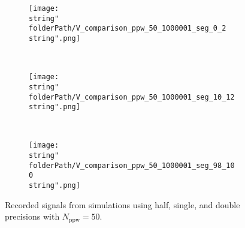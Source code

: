 

\renewcommand{\folderPath}{\string"./fig/1D_example/validate/dt_dx/comparison/plot_dt_h_10_9p997558593749999e-05_dt_h_30_9p997558593749999e-05_dt_h_50_9p997558593749999e-05/half_compensated_chop_D_3_chop_dt_dx_3_slow2sum_single_double/\string"}


\hspace{-0.05\textwidth}
\begin{minipage}[t]{.5\textwidth}
%
\begin{figure}[H]
\captionsetup{width=0.95\textwidth,font=footnotesize,labelfont=footnotesize}
\centering
%
\begin{subfigure}[b]{1\textwidth}
%
\centering\texttt{[image: \\string"\\folderPath/V\_comparison\_ppw\_50\_1000001\_seg\_0\_2\\string".png]}
%
\end{subfigure}\hfill
\\[2ex]
%
\begin{subfigure}[b]{1\textwidth}
%
\centering\texttt{[image: \\string"\\folderPath/V\_comparison\_ppw\_50\_1000001\_seg\_10\_12\\string".png]}
%
\end{subfigure}\hfill
\\[2ex]
%
\begin{subfigure}[b]{1\textwidth}
%
\centering\texttt{[image: \\string"\\folderPath/V\_comparison\_ppw\_50\_1000001\_seg\_98\_100\\string".png]}
%
\end{subfigure}\hfill
%
\caption{Recorded signals from simulations using half, single, and double precisions with $N_\text{ppw}=50$.}
\label{comparison_V_half_compensated_segments_ppw_50_slow2sum}
\end{figure}
%
\end{minipage}
%
\hfill %
%

